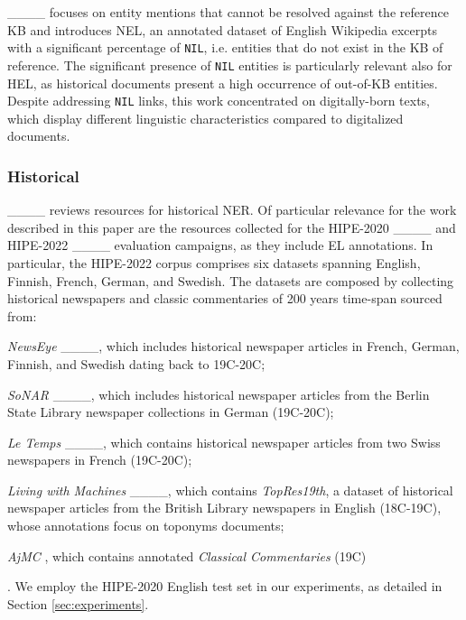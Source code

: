 ____ focuses on entity mentions that cannot be resolved against the reference KB and introduces NEL, an annotated dataset of English Wikipedia excerpts with a significant percentage of \texttt{NIL}, i.e. entities that do not exist in the KB of reference. The significant presence of \texttt{NIL} entities is particularly relevant also for HEL, as historical documents present a high occurrence of out-of-KB entities. Despite addressing \texttt{NIL} links, this work concentrated on digitally-born texts, which display different linguistic characteristics compared to digitalized documents.

\subsubsection*{Historical}
____ reviews resources for historical NER. Of particular relevance for the work described in this paper are the resources collected for the HIPE-2020 ____ and HIPE-2022 ____ evaluation campaigns, as they include EL annotations.
In particular, the HIPE-2022 corpus comprises six datasets spanning English, Finnish, French, German, and Swedish. The datasets are composed by collecting historical newspapers and classic commentaries of 200 years time-span %
sourced from:
\begin{enumerate*}[label=(\roman*)]
    \item \emph{NewsEye} ____, which includes historical newspaper articles in French, German, Finnish, and Swedish dating back to 19C-20C;
    \item \emph{SoNAR} ____, which includes historical newspaper articles from the Berlin State Library newspaper collections in German (19C-20C);
    \item \emph{Le Temps} ____, which contains historical newspaper articles from two Swiss newspapers in French (19C-20C);
    \item \emph{Living with Machines} ____, which contains \textit{TopRes19th}, a dataset of historical newspaper articles from the British Library newspapers in English (18C-19C), whose annotations focus on toponyms documents;
    \item \emph{AjMC}%
    , which contains annotated \textit{Classical Commentaries} (19C)
\end{enumerate*}.
We employ the HIPE-2020 English test set in our experiments, as detailed in Section \ref{sec:experiments}.

